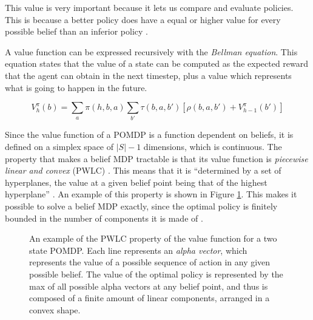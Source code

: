 This value is very important because it lets us compare and evaluate policies. This is because a
better policy does have a equal or higher value for every possible belief than an inferior policy
\cite{cit:suttonbarto}.

A value function can be expressed recursively with the \textit{Bellman equation}. This equation
states that the value of a state can be computed as the expected reward that the agent can obtain in
the next timestep, plus a value which represents what is going to happen in the future.

\begin{equation}
 V^{\pi}_{h}(b) = \sum_a \pi(h, b, a) \sum_{b'} \tau(b, a, b') \left [ \rho(b, a, b') +
V^{\pi}_{h-1}(b') \right ]
\end{equation}

Since the value function of a POMDP is a function dependent on beliefs, it is defined on a simplex
space of $|S|-1$ dimensions, which is continuous. The property that makes a belief MDP tractable is
that its value function is \textit{piecewise linear and convex} (PWLC) \cite{cit:pomdp}. This means that it is
``determined by a set of hyperplanes, the value at a given belief point being that of the highest
hyperplane'' \cite{cit:rpomdp}. An example of this property is shown in Figure \ref{pwlcpic}. This
makes it possible to solve a belief MDP exactly, since the optimal policy is finitely bounded in the
number of components it is made of \cite{cit:pomdp}.

\begin{figure}[ht]
\begin{center}
\end{center}
\caption{An example of the PWLC property of the value function for a two state POMDP. Each line
represents an \textit{alpha vector}, which represents the value of a possible sequence of action in
any given possible belief. The value of the optimal policy is represented by the max of all possible
alpha vectors at any belief point, and thus is composed of a finite amount of linear components,
arranged in a convex shape.}
\label{pwlcpic}
\end{figure}


